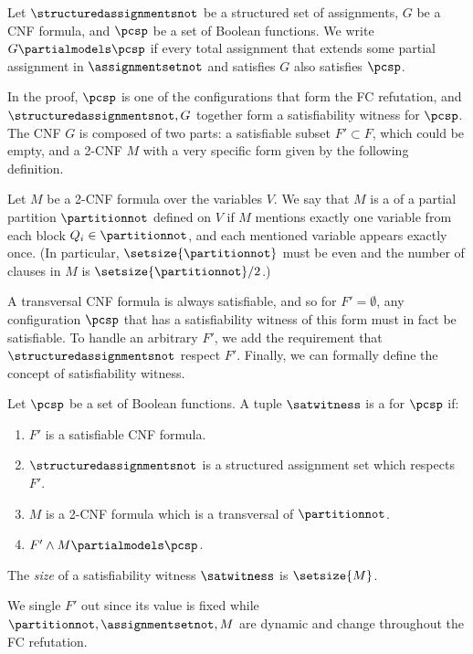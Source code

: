 \documentclass{toc}
\begin{document}
\begin{definition}
  \label{def:partialmodels}
  Let $\structuredassignmentsnot$ be a structured set of assignments, $G$ be a
  CNF formula, and $\pcsp$ be a set of Boolean functions.
  We write $G \partialmodels \pcsp$ if every total assignment that extends some partial assignment in $\assignmentsetnot$ and satisfies $G$ also satisfies $\pcsp$.
\end{definition}

In the proof, $\pcsp$ is one of the configurations that form the FC refutation, and $\structuredassignmentsnot,G$ together form a satisfiability witness for $\pcsp$. The CNF $G$ is composed of two parts: a satisfiable subset $F' \subset F$, which could be empty, and a 2-CNF $M$ with a very specific form given by the following definition.

\begin{definition}
  \label{def:transversal}
  Let $M$ be a 2-CNF formula over the variables $V$. We say that $M$ is a  of a partial partition $\partitionnot$ defined on $V$ if $M$ mentions exactly one variable from each block $Q_i \in \partitionnot$, and each mentioned variable appears exactly once. (In particular, $\setsize{\partitionnot}$ must be even and the number of clauses in $M$ is $\setsize{\partitionnot}/2$.)
\end{definition}

A transversal CNF formula is always satisfiable, and so for $F' = \emptyset$, any configuration $\pcsp$ that has a satisfiability witness of this form must in fact be satisfiable. To handle an arbitrary $F'$, we add the requirement that $\structuredassignmentsnot$ respect $F'$. Finally, we can formally define the concept of satisfiability witness.
%

\begin{definition}
 \label{def:witness}
 Let $\pcsp$ be a set of Boolean functions. A tuple $\satwitness$ is a  for $\pcsp$ if:
\begin{enumerate}
 \item $F'$ is a satisfiable CNF formula.
 \item $\structuredassignmentsnot$ is a structured assignment set which respects $F'$.
 \item $M$ is a 2-CNF formula which is a transversal of $\partitionnot$.
 \item $F'\land M \partialmodels \pcsp$.
\end{enumerate}
 The \emph{size} of a satisfiability witness $\satwitness$ is $\setsize{M}$.
\end{definition}
We single $F'$ out since its value is fixed while $\partitionnot,\assignmentsetnot,M$ are dynamic and change throughout the FC refutation.
\end{document}
